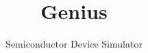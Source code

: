 \documentclass{cgdmanen}
\begin{document}
\title{Genius}
\subtitle{Semiconductor Device Simulator}
\date{}
\maketitle


\clearpage\pagestyle{empty}
\tableofcontents{}

\clearpage\pagestyle{heading}\setcounter{page}{1}





\printindex{}
\backcover
\end{document}
